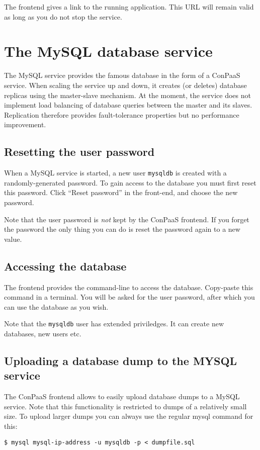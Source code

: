 \documentclass[10pt]{article}
\begin{document}
The frontend gives a link to the running application. This URL will
remain valid as long as you do not stop the service.


\section{The MySQL database service}

The MySQL service provides the famous database in the form of a
ConPaaS service. When scaling the service up and down, it creates (or
deletes) database replicas using the master-slave mechanism. At the
moment, the service does not implement load balancing of database
queries between the master and its slaves. Replication therefore
provides fault-tolerance properties but no performance improvement.

\subsection{Resetting the user password}

When a MySQL service is started, a new user \texttt{mysqldb} is
created with a randomly-generated password. To gain access to the
database you must first reset this password. Click ``Reset password''
in the front-end, and choose the new password.

Note that the user password is \emph{not} kept by the ConPaaS
frontend. If you forget the password the only thing you can do is
reset the password again to a new value.

\subsection{Accessing the database} 

The frontend provides the command-line to access the database.
Copy-paste this command in a terminal. You will be asked for the user
password, after which you can use the database as you wish.

Note that the \texttt{mysqldb} user has extended priviledges. It can
create new databases, new users etc.

\subsection{Uploading a database dump to the MYSQL service}

The ConPaaS frontend allows to easily upload database dumps to a MySQL service. Note that this functionality is restricted to dumps of a relatively small size. To upload larger dumps you can always use the regular mysql command for this:
\begin{verbatim}
$ mysql mysql-ip-address -u mysqldb -p < dumpfile.sql
\end{verbatim}
\end{document}
